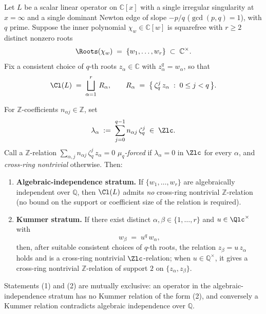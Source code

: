 \begin{theorem}\label{thm:D2}
Let $L$ be a scalar linear operator on $\mathbb{C}[x]$ with a single
irregular singularity at $x = \infty$ and a single dominant Newton edge
of slope $-p/q$ ($\gcd(p, q) = 1$), with $q$ prime. Suppose the inner
polynomial $\chi_w \in \mathbb{C}[w]$ is squarefree with
$r \ge 2$ distinct nonzero roots
\[
   \Roots(\chi_w) \;=\; \{w_1, \dots, w_r\} \;\subset\;
   \mathbb{C}^\times.
\]
Fix a consistent choice of $q$-th roots $z_\alpha \in \mathbb{C}$
with $z_\alpha^q = w_\alpha$, so that
\[
   \Cl(L) \;=\; \bigsqcup_{\alpha = 1}^{r}\, R_\alpha,
   \qquad
   R_\alpha \;=\; \big\{\,\zeta_q^j\, z_\alpha\;:\; 0 \le j < q\,\big\}.
\]

For $\mathbb{Z}$-coefficients $n_{\alpha j} \in \mathbb{Z}$, set
\[
   \lambda_\alpha \;:=\; \sum_{j = 0}^{q-1} n_{\alpha j}\, \zeta_q^j
   \;\in\; \Zlc.
\]
Call a $\mathbb{Z}$-relation $\sum_{\alpha, j} n_{\alpha j}\, \zeta_q^j\,
z_\alpha = 0$ \emph{$\mu_q$-forced} if $\lambda_\alpha = 0$ in $\Zlc$
for every $\alpha$, and \emph{cross-ring nontrivial} otherwise. Then:
\begin{enumerate}[leftmargin=2em]
\item \textbf{Algebraic-independence stratum.} If $\{w_1, \dots, w_r\}$
are algebraically independent over $\mathbb{Q}$, then $\Cl(L)$ admits
\emph{no} cross-ring nontrivial $\mathbb{Z}$-relation (no bound on
the support or coefficient size of the relation is required).
\item \textbf{Kummer stratum.} If there exist distinct
$\alpha, \beta \in \{1, \dots, r\}$ and $u \in \Qlc^\times$ with
\[
   w_\beta \;=\; u^q\, w_\alpha,
\]
then, after suitable consistent choices of $q$-th roots, the relation
$z_\beta = u\, z_\alpha$ holds and is a cross-ring nontrivial
$\Zlc$-relation; when $u \in \mathbb{Q}^\times$, it gives a
cross-ring nontrivial $\mathbb{Z}$-relation of support $2$ on
$\{z_\alpha, z_\beta\}$.
\end{enumerate}
Statements (1) and (2) are mutually exclusive: an operator in the
algebraic-independence stratum has no Kummer relation of the form (2),
and conversely a Kummer relation contradicts algebraic independence
over $\mathbb{Q}$.
\end{theorem}

